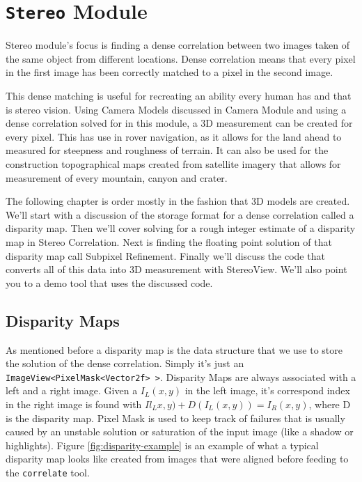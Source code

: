 \chapter{{\tt Stereo} Module}
\label{ch:stereo-module}

Stereo module's focus is finding a dense correlation between two
images taken of the same object from different locations. Dense
correlation means that every pixel in the first image has been
correctly matched to a pixel in the second image.

This dense matching is useful for recreating an ability every human
has and that is stereo vision. Using Camera Models discussed in Camera
Module and using a dense correlation solved for in this module, a 3D
measurement can be created for every pixel. This has use in rover
navigation, as it allows for the land ahead to measured for steepness
and roughness of terrain. It can also be used for the construction
topographical maps created from satellite imagery that allows for
measurement of every mountain, canyon and crater.

The following chapter is order mostly in the fashion that 3D models
are created. We'll start with a discussion of the storage format for a
dense correlation called a disparity map. Then we'll cover solving for
a rough integer estimate of a disparity map in Stereo
Correlation. Next is finding the floating point solution of that
disparity map call Subpixel Refinement. Finally we'll discuss the code
that converts all of this data into 3D measurement with
StereoView. We'll also point you to a demo tool that uses the
discussed code.

\section{Disparity Maps}
\label{sec:disaprity_maps}

As mentioned before a disparity map is the data structure that we use
to store the solution of the dense correlation. Simply it's just an
{\tt ImageView<PixelMask<Vector2f> >}. Disparity Maps are always
associated with a left and a right image. Given a $I_L(x,y)$ in the
left image, it's correspond index in the right image is found with
$Il_Lx,y) + D(I_L(x,y)) = I_R(x,y)$, where D is the disparity
map. Pixel Mask is used to keep track of failures that is usually
caused by an unstable solution or saturation of the input image (like
a shadow or highlights). Figure \ref{fig:disparity-example} is an
example of what a typical disparity map looks like created from images
that were aligned before feeding to the {\tt correlate} tool.


